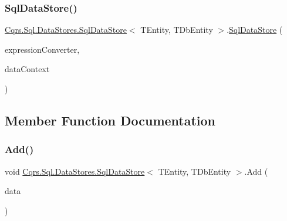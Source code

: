 \subsubsection{\texorpdfstring{Sql\+Data\+Store()}{SqlDataStore()}}
{\footnotesize\ttfamily \hyperlink{classCqrs_1_1Sql_1_1DataStores_1_1SqlDataStore}{Cqrs.\+Sql.\+Data\+Stores.\+Sql\+Data\+Store}$<$ T\+Entity, T\+Db\+Entity $>$.\hyperlink{classCqrs_1_1Sql_1_1DataStores_1_1SqlDataStore}{Sql\+Data\+Store} (\begin{DoxyParamCaption}\item[{\hyperlink{interfaceCqrs_1_1Sql_1_1DataStores_1_1IExpressionTreeConverter}{I\+Expression\+Tree\+Converter}}]{expression\+Converter,  }\item[{Data\+Context}]{data\+Context }\end{DoxyParamCaption})}



\subsection{Member Function Documentation}
\mbox{\label{classCqrs_1_1Sql_1_1DataStores_1_1SqlDataStore_a715ab041546e864cb9551d165c240f33_a715ab041546e864cb9551d165c240f33}} 
\subsubsection{\texorpdfstring{Add()}{Add()}\hspace{0.1cm}{\footnotesize\ttfamily [1/2]}}
{\footnotesize\ttfamily void \hyperlink{classCqrs_1_1Sql_1_1DataStores_1_1SqlDataStore}{Cqrs.\+Sql.\+Data\+Stores.\+Sql\+Data\+Store}$<$ T\+Entity, T\+Db\+Entity $>$.Add (\begin{DoxyParamCaption}\item[{T\+Entity}]{data }\end{DoxyParamCaption})}

\mbox{\label{classCqrs_1_1Sql_1_1DataStores_1_1SqlDataStore_a510fc3eafe64f999b99290cd8924a00e_a510fc3eafe64f999b99290cd8924a00e}} 
